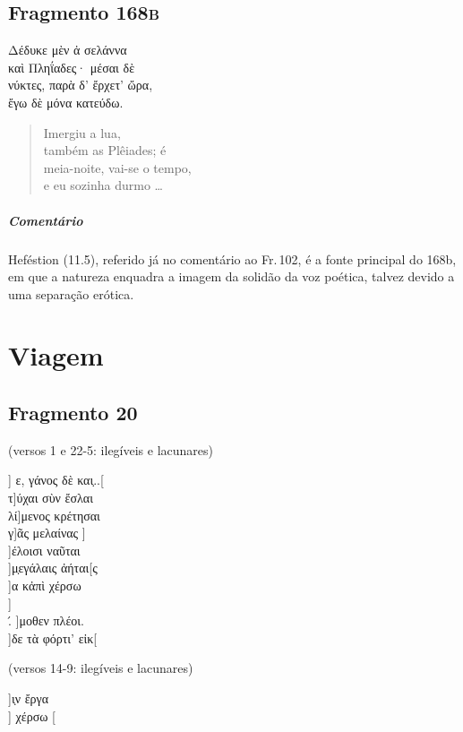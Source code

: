 \section{Fragmento 168\textsc{b}}

\begin{gkverse}
Δέδυκε μὲν ἀ σελάννα\\
καὶ Πληΐαδες· μέσαι δὲ\\
νύκτες, παρὰ δ’ ἔρχετ’ ὤρα,\\
ἔγω δὲ μόνα κατεύδω.
\end{gkverse}

\begin{verse}
Imergiu a lua,\\
também as Plêiades; é\\
meia-noite, vai-se o tempo,\\
e eu sozinha durmo \ldots{}
\end{verse}

{\paragraph{Comentário} Heféstion (11.5), referido já no comentário ao Fr.\,102, é a fonte principal do 168b, em que a natureza enquadra a imagem da solidão da voz poética, talvez devido a uma separação erótica.}


\chapter{Viagem}

\section{Fragmento 20}

\begin{gkverse}
\textnormal{(versos 1 e 22-5: ilegíveis e lacunares)}

] ε, γάνος δὲ και̣..[\\
τ]ύχαι σὺν ἔσλαι\\
         λί]μενος κρέτησαι\\
  γ]ᾶς μελαίνας
    ]\\
    ]έλοισι ναῦται\\
  ]μ̣εγάλαις ἀήται[ς\\
  ]α κἀπὶ χέρσω\\
    ]\\
  .́ ]μοθεν πλέοι.\\
  ]δε τὰ φόρτι’ εἰκ[

\textnormal{(versos 14-9: ilegíveis e lacunares)}

]ι̣ν ἔργα\\
] χέρσω [
\end{gkverse}

